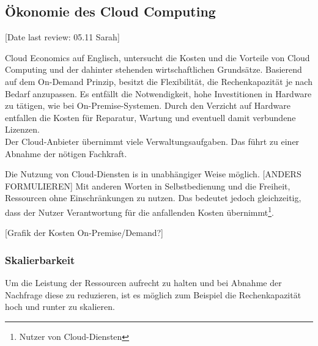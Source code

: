 \subsection{Ökonomie des Cloud Computing}\label{subsec_UabsGrund3}
[Date last review: 05.11 Sarah]
\begin{flushleft}

      Cloud Economics auf Englisch, untersucht die Kosten und die Vorteile von Cloud Computing und der dahinter stehenden wirtschaftlichen Grundsätze. Basierend auf dem On-Demand Prinzip, besitzt die Flexibilität, die Rechenkapazität je nach Bedarf anzupassen.
      Es entfällt die Notwendigkeit, hohe Investitionen in Hardware zu tätigen, wie bei On-Premise-Systemen.
      Durch den Verzicht auf Hardware entfallen die Kosten für Reparatur, Wartung und eventuell damit verbundene Lizenzen.
      \\
      Der Cloud-Anbieter übernimmt viele Verwaltungsaufgaben. Das führt zu einer Abnahme der nötigen Fachkraft.
            {\cite{IDC01}}

      Die Nutzung von Cloud-Diensten is in unabhängiger Weise möglich.
      [ANDERS FORMULIEREN]
      Mit anderen Worten in Selbstbedienung und die Freiheit, Ressourcen ohne Einschränkungen zu nutzen. Das bedeutet jedoch gleichzeitig, dass der Nutzer Verantwortung für die anfallenden Kosten übernimmt\footnote{Nutzer von Cloud-Diensten}.
\end{flushleft}

[Grafik der Kosten On-Premise/Demand?]

\subsubsection{Skalierbarkeit}
Um die Leistung der Ressourcen aufrecht zu halten und bei Abnahme der Nachfrage diese zu reduzieren,  ist es möglich zum Beispiel die Rechenkapazität hoch und runter zu skalieren.

